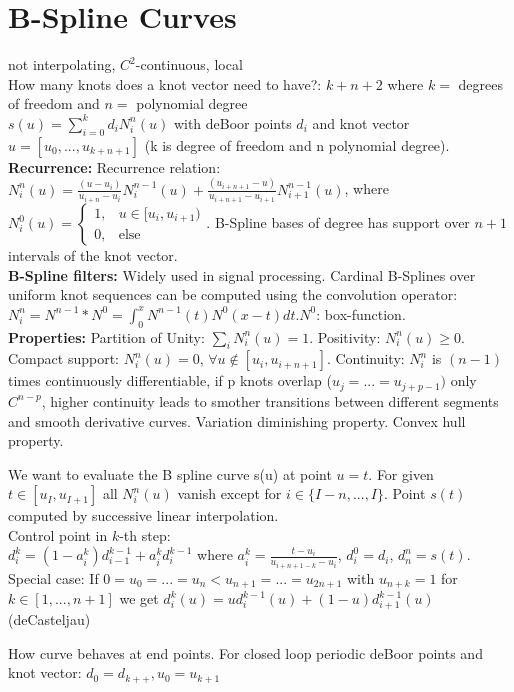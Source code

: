 \section{B-Spline Curves}
not interpolating, $C^2$-continuous, local\\
How many knots does a knot vector need to have?: $k + n + 2$ where $k = $ degrees of freedom and $n = $ polynomial degree\\
 $s(u) = \sum_{i=0}^kd_iN_i^n(u)$ with deBoor points $d_i$ and knot vector $u = [u_0, ..., u_{k+n+1}]$ (k is degree of freedom and n polynomial degree).\\ 
\textbf{Recurrence:} Recurrence relation: $N_i^n(u) = \frac{(u - u_i)}{u_{i+n} - u_i} N_i^{n-1}(u) + \frac{(u_{i+n+1} - u)}{u_{i+n+1} - u_{i+1}} N_{i+1}^{n-1}(u)$, where $N_i^0(u) = \begin{cases} 1, & u \in [u_i, u_{i+1}) \\ 0, & \text{else} \end{cases}$. B-Spline bases of degree has support over $n+1$ intervals of the knot vector.\\
\textbf{B-Spline filters:} Widely used in signal processing. Cardinal B-Splines over uniform knot sequences can be computed using the convolution operator: \( N_i^n = N^{n-1} * N^0 = \int_{0}^{x} N^{n-1}(t)N^0(x - t) dt \).\( N^0 \): box-function.\\
\textbf{Properties:} 
Partition of Unity: $\sum_i N_i^n(u) = 1$. 
Positivity: $N_i^n(u) \geq 0$.
Compact support: $N_i^n(u) = 0$, $\forall u \notin [u_i, u_{i+n+1}]$.
Continuity: $N_i^n$ is $(n-1)$ times continuously differentiable, if p knots overlap ($u_j = ... = u_{j+p-1})$ only $C^{n-p}$, higher continuity leads to smother transitions between different segments and smooth derivative curves.
Variation diminishing property.
Convex hull property.


 We want to evaluate the B spline curve s(u) at point $u=t$. For given $t \in [u_I, u_{I+1}]$ all $N_i^n(u)$ vanish except for $i \in \{I-n, ...,I\}$. Point $s(t)$ computed by successive linear interpolation.\\
Control point in $k$-th step: \\
$d_i^k = (1 - a_i^k)d_{i-1}^{k-1} + a_i^k d_i^{k-1} $ where $ a_i^k = \frac{t - u_i}{u_{i+n+1-k} - u_i} $, $d_i^0 = d_i$, $d_n^n = s(t)$. \\
Special case: If $0 = u_0 = ... = u_n < u_{n+1} = ... = u_{2n+1}$ with $u_{n+k} = 1$ for $k \in [1, ...,n+1]$ we get $d_i^k(u)=ud_i^{k-1}(u)+(1-u)d_{i+1}^{k-1}(u)$ (deCasteljau)

 How curve behaves at end points. For closed loop periodic deBoor points and knot vector: $d_0=d_{k++}, u_0=u_{k+1}$